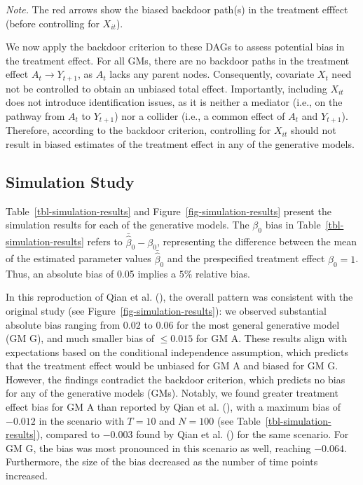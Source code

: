 \documentclass[
  11pt,
  a4paper,
]{article}
\begin{document}
\emph{Note.} The red arrows show the biased backdoor path(s) in the
treatment efffect (before controlling for \(X_{it}\)).

\vspace{2em}

We now apply the backdoor criterion to these DAGs to assess potential
bias in the treatment effect. For all GMs, there are no backdoor paths
in the treatment effect \(A_t \to Y_{t+1}\), as \(A_t\) lacks any parent
nodes. Consequently, covariate \(X_t\) need not be controlled to obtain
an unbiased total effect. Importantly, including \(X_{it}\) does not
introduce identification issues, as it is neither a mediator (i.e., on
the pathway from \(A_t\) to \(Y_{t+1}\)) nor a collider (i.e., a common
effect of \(A_t\) and \(Y_{t+1}\)). Therefore, according to the backdoor
criterion, controlling for \(X_{it}\) should not result in biased
estimates of the treatment effect in any of the generative models.

\subsection{Simulation Study}\label{simulation-study}

Table~\ref{tbl-simulation-results} and
Figure~\ref{fig-simulation-results} present the simulation results for
each of the generative models. The \(\beta_0\) bias in
Table~\ref{tbl-simulation-results} refers to
\(\bar{\hat{\beta}}_{0} - \beta_{0}\), representing the difference
between the mean of the estimated parameter values
\(\bar{\hat{\beta}}_{0}\) and the prespecified treatment effect
\(\beta_{0} = 1\). Thus, an absolute bias of 0.05 implies a \(5\%\)
relative bias.

In this reproduction of Qian et al. (), the
overall pattern was consistent with the original study (see
Figure~\ref{fig-simulation-results}): we observed substantial absolute
bias ranging from \(0.02\) to \(0.06\) for the most general generative
model (GM G), and much smaller bias of \(\leq 0.015\) for GM A. These
results align with expectations based on the conditional independence
assumption, which predicts that the treatment effect would be unbiased
for GM A and biased for GM G. However, the findings contradict the
backdoor criterion, which predicts no bias for any of the generative
models (GMs). Notably, we found greater treatment effect bias for GM A
than reported by Qian et al. (), with a
maximum bias of \(-0.012\) in the scenario with \(T = 10\) and
\(N = 100\) (see Table~\ref{tbl-simulation-results}), compared to
\(-0.003\) found by Qian et al. () for the
same scenario. For GM G, the bias was most pronounced in this scenario
as well, reaching \(-0.064\). Furthermore, the size of the bias
decreased as the number of time points increased.
\end{document}
